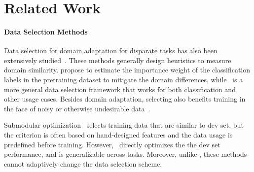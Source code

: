 \section{\label{sec:related_work}Related Work}
\paragraph{Data Selection Methods} Data selection for domain adaptation for disparate tasks has also been extensively studied~\citep{moore2010intelligent,axelrod2011domain,domain_adapt_transfer,jiang-zhai-2007-instance,foster-etal-2010-discriminative,wang-etal-2017-instance}. These methods generally design heuristics to measure domain similarity.
\cite{domain_adapt_transfer} propose to estimate the importance weight of the classification labels in the pretraining dataset to mitigate the domain differences, while \dds~is a more general data selection framework that works for both classification and other usage cases. Besides domain adaptation, selecting also benefits training in the face of noisy or otherwise undesirable data~\citep{vyas-etal-2018-identifying,pham-etal-2018-fixing}. 

Submodular optimization~\citep{submodular_mt,learn_mix_submodular} selects training data that are similar to dev set, but the criterion is often based on hand-designed features and the data usage is predefined before training. However, \dds~directly optimizes the the dev set performance, and is generalizable across tasks. Moreover, unlike \dds, these methods cannot adaptively change the data selection scheme. 


